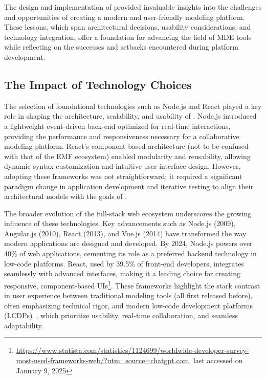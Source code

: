 The design and implementation of \jjodel{} provided invaluable insights into the challenges and opportunities of creating a modern and user-friendly modeling platform. These lessons, which span architectural decisions, usability considerations, and technology integration, offer a foundation for advancing the field of MDE tools while reflecting on the successes and setbacks encountered during platform development.

\subsection{The Impact of Technology Choices}

The selection of foundational technologies such as Node.js and React played a key role in shaping the architecture, scalability, and usability of \jjodel{}. Node.js introduced a lightweight event-driven back-end optimized for real-time interactions, providing the performance and responsiveness necessary for a collaborative modeling platform. React’s component-based architecture (not to be confused with that of the EMF ecosystem)  enabled modularity and reusability, allowing dynamic syntax customization and intuitive user interface design. However, adopting these frameworks was not straightforward; it required a significant paradigm change in application development and iterative testing to align their architectural models with the goals of \jjodel{}.

The broader evolution of the full-stack web ecosystem underscores the growing influence of these technologies. Key advancements such as Node.js (2009), Angular.js (2010), React (2013), and Vue.js (2014) have transformed the way modern applications are designed and developed. By 2024, Node.js powers over 40\% of web applications, cementing its role as a preferred backend technology in low-code platforms. React, used by 39.5\% of front-end developers, integrates seamlessly with advanced interfaces, making it a leading choice for creating responsive, component-based UIs\footnote{\url{https://www.statista.com/statistics/1124699/worldwide-developer-survey-most-used-frameworks-web/?utm_source=chatgpt.com}, last accessed on January 9, 2025}. These frameworks highlight the stark contrast in user experience between traditional modeling tools (all first released before), often emphasizing technical rigor, and modern low-code development platforms (LCDPs)~\cite{sahay2020supporting,prinz2021low}, which prioritize usability, real-time collaboration, and seamless adaptability.

